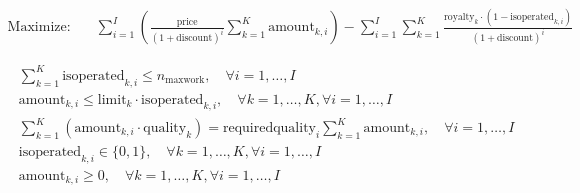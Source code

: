 \documentclass{article}
\begin{document}
\newcommand{\nmines}{n_{\text{mines}}}
\newcommand{\nmaxwork}{n_{\text{maxwork}}}
\newcommand{\royalty}{\text{royalty}}
\newcommand{\limit}{\text{limit}}
\newcommand{\quality}{\text{quality}}
\newcommand{\requiredquality}{\text{requiredquality}}
\newcommand{\price}{\text{price}}
\newcommand{\discount}{\text{discount}}
\newcommand{\isoperated}{\text{isoperated}}
\newcommand{\amount}{\text{amount}}

\begin{align*}
\text{Maximize:} \quad & \sum_{i=1}^{I} \left( \frac{\price}{(1 + \discount)^i} \sum_{k=1}^{K} \amount_{k,i} \right) - \sum_{i=1}^{I} \sum_{k=1}^{K} \frac{\royalty_k \cdot (1 - \isoperated_{k,i})}{(1 + \discount)^i}
\end{align*}

\begin{align*}
& \sum_{k=1}^{K} \isoperated_{k,i} \leq \nmaxwork, \quad \forall i = 1,\ldots,I \\
& \amount_{k,i} \leq \limit_k \cdot \isoperated_{k,i}, \quad \forall k = 1,\ldots,K, \forall i = 1,\ldots,I \\
& \sum_{k=1}^{K} \left( \amount_{k,i} \cdot \quality_k \right) = \requiredquality_i \sum_{k=1}^{K} \amount_{k,i}, \quad \forall i = 1,\ldots,I \\
& \isoperated_{k,i} \in \{0, 1\}, \quad \forall k = 1,\ldots,K, \forall i = 1,\ldots,I \\
& \amount_{k,i} \geq 0, \quad \forall k = 1,\ldots,K, \forall i = 1,\ldots,I
\end{align*}
\end{document}
